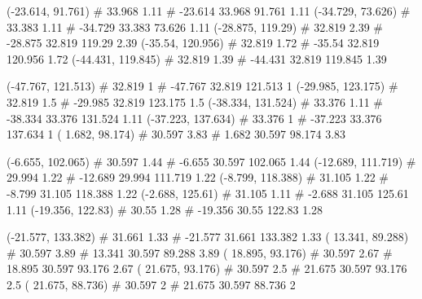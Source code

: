 \documentclass[a4paper,openbib,10pt]{article}
\newenvironment{treegraph}{\begin{graph}}{\end{graph}}
\begin{document}
\begin{treegraph}
  (-23.614, 91.761) #     33.968    1.11
   #    -23.614    33.968    91.761    1.11
  (-34.729, 73.626) #     33.383    1.11
   #    -34.729    33.383    73.626    1.11
  (-28.875, 119.29) #     32.819    2.39
   #    -28.875    32.819    119.29    2.39
  (-35.54, 120.956) #     32.819    1.72
   #    -35.54    32.819    120.956    1.72
  (-44.431, 119.845) #     32.819    1.39
   #    -44.431    32.819    119.845    1.39

  (-47.767, 121.513) #     32.819    1
   #    -47.767    32.819    121.513    1
  (-29.985, 123.175) #     32.819    1.5
   #    -29.985    32.819    123.175    1.5
  (-38.334, 131.524) #     33.376    1.11
   #    -38.334    33.376    131.524    1.11
  (-37.223, 137.634) #     33.376    1
   #    -37.223    33.376    137.634    1
  ( 1.682, 98.174) #     30.597    3.83
   #    1.682    30.597    98.174    3.83

  (-6.655, 102.065) #     30.597    1.44
   #    -6.655    30.597    102.065    1.44
  (-12.689, 111.719) #     29.994    1.22
   #    -12.689    29.994    111.719    1.22
  (-8.799, 118.388) #     31.105    1.22
   #    -8.799    31.105    118.388    1.22
  (-2.688, 125.61) #     31.105    1.11
   #    -2.688    31.105    125.61    1.11
  (-19.356, 122.83) #     30.55    1.28
   #    -19.356    30.55    122.83    1.28

  (-21.577, 133.382) #     31.661    1.33
   #    -21.577    31.661    133.382    1.33
  ( 13.341, 89.288) #     30.597    3.89
   #    13.341    30.597    89.288    3.89
  ( 18.895, 93.176) #     30.597    2.67
   #    18.895    30.597    93.176    2.67
  ( 21.675, 93.176) #     30.597    2.5
   #    21.675    30.597    93.176    2.5
  ( 21.675, 88.736) #     30.597    2
   #    21.675    30.597    88.736    2


\end{treegraph}
\end{document}
